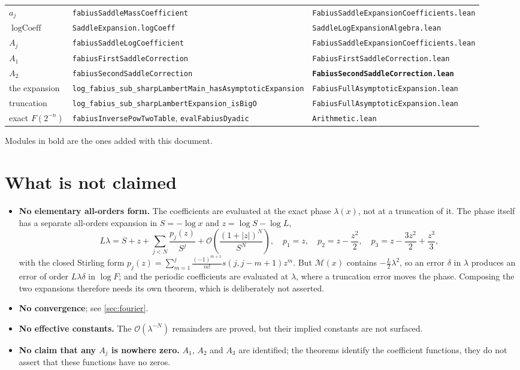 \documentclass[11pt,oneside]{article}
\theoremstyle{definition}
\theoremstyle{remark}
\newcommand{\bigO}{\mathcal O}
\begin{document}
\begin{center}
\begin{longtable}{@{}lll@{}}
$a_j$ & \texttt{fabiusSaddleMassCoefficient} & \texttt{FabiusSaddleExpansionCoefficients.lean}\\
$\operatorname{logCoeff}$ & \texttt{SaddleExpansion.logCoeff} & \texttt{SaddleLogExpansionAlgebra.lean}\\
$A_j$ & \texttt{fabiusSaddleLogCoefficient} & \texttt{FabiusSaddleExpansionCoefficients.lean}\\
$A_1$ & \texttt{fabiusFirstSaddleCorrection} & \texttt{FabiusFirstSaddleCorrection.lean}\\
$A_2$ & \texttt{fabiusSecondSaddleCorrection} & \textbf{\texttt{FabiusSecondSaddleCorrection.lean}}\\
the expansion & \texttt{log\_fabius\_sub\_sharpLambertMain\_hasAsymptoticExpansion} & \texttt{FabiusFullAsymptoticExpansion.lean}\\
truncation & \texttt{log\_fabius\_sub\_sharpLambertExpansion\_isBigO} & \texttt{FabiusFullAsymptoticExpansion.lean}\\
exact $F(2^{-n})$ & \texttt{fabiusInversePowTwoTable}, \texttt{evalFabiusDyadic} & \texttt{Arithmetic.lean}\\
\bottomrule
\end{longtable}
\end{center}

Modules in bold are the ones added with this document.

\section{What is not claimed}\label{sec:notclaimed}

\begin{itemize}
\item \textbf{No elementary all-orders form.}  The coefficients are evaluated at
  the exact phase $\lambda(x)$, not at a truncation of it.  The phase itself has
  a separate all-orders expansion in $S=-\log x$ and $z=\log S-\log L$,
  \[
    L\lambda=S+z+\sum_{j<N}\frac{p_j(z)}{S^j}+\bigO\!\left(\frac{(1+|z|)^N}{S^N}\right),
    \quad p_1=z,\quad p_2=z-\frac{z^2}{2},\quad p_3=z-\frac{3z^2}{2}+\frac{z^3}{3},
  \]
  with the closed Stirling form
  $p_j(z)=\sum_{m=1}^{j}\frac{(-1)^{m+1}}{m!}s(j,j-m+1)z^m$.  But
  $\mathcal M(x)$ contains $-\tfrac L2\lambda^2$, so an error $\delta$ in
  $\lambda$ produces an error of order $L\lambda\delta$ in $\log F$; and the
  periodic coefficients are evaluated at $\lambda$, where a truncation error
  moves the phase.  Composing the two expansions therefore needs its own
  theorem, which is deliberately not asserted.
\item \textbf{No convergence}; see \cref{sec:fourier}.
\item \textbf{No effective constants.}  The $\bigO(\lambda^{-N})$ remainders are
  proved, but their implied constants are not surfaced.
\item \textbf{No claim that any $A_j$ is nowhere zero.}  $A_1$, $A_2$ and $A_3$
  are identified; the theorems identify the coefficient functions, they do not
  assert that these functions have no zeros.
\end{itemize}
\end{document}
